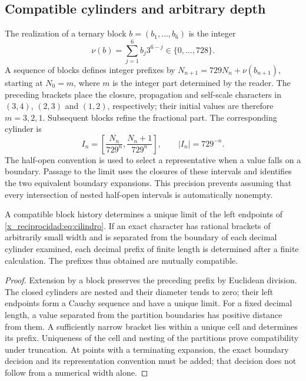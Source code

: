 

\subsection{Compatible cylinders and arbitrary depth}

The realization of a ternary block \(b=(b_1,\ldots,b_6)\) is the integer
\[
 \nu(b)=\sum_{j=1}^6b_j3^{6-j}\in\{0,\ldots,728\}.
\]
A sequence of blocks defines integer prefixes by \(N_{n+1}=729N_n+\nu(b_{n+1})\), starting at \(N_0=m\), where \(m\) is the integer part determined by the reader. The preceding brackets place the closure, propagation and self-scale characters in \((3,4)\), \((2,3)\) and \((1,2)\), respectively; their initial values are therefore \(m=3,2,1\). Subsequent blocks refine the fractional part. The corresponding cylinder is
\begin{equation}
 I_n=\left[\frac{N_n}{729^n},\frac{N_n+1}{729^n}\right],
 \qquad |I_n|=729^{-n}.
 \label{x_reciprocidad:eq:cilindro}
\end{equation}
The half-open convention is used to select a representative when a value falls on a boundary. Passage to the limit uses the closures of these intervals and identifies the two equivalent boundary expansions. This precision prevents assuming that every intersection of nested half-open intervals is automatically nonempty.

\begin{theorem}
A compatible block history determines a unique limit of the left endpoints of \eqref{x_reciprocidad:eq:cilindro}. If an exact character has rational brackets of arbitrarily small width and is separated from the boundary of each decimal cylinder examined, each decimal prefix of finite length is determined after a finite calculation. The prefixes thus obtained are mutually compatible.
\end{theorem}
\begin{proof}
Extension by a block preserves the preceding prefix by Euclidean division. The closed cylinders are nested and their diameter tends to zero; their left endpoints form a Cauchy sequence and have a unique limit. For a fixed decimal length, a value separated from the partition boundaries has positive distance from them. A sufficiently narrow bracket lies within a unique cell and determines its prefix. Uniqueness of the cell and nesting of the partitions prove compatibility under truncation. At points with a terminating expansion, the exact boundary decision and its representation convention must be added; that decision does not follow from a numerical width alone.
\end{proof}

